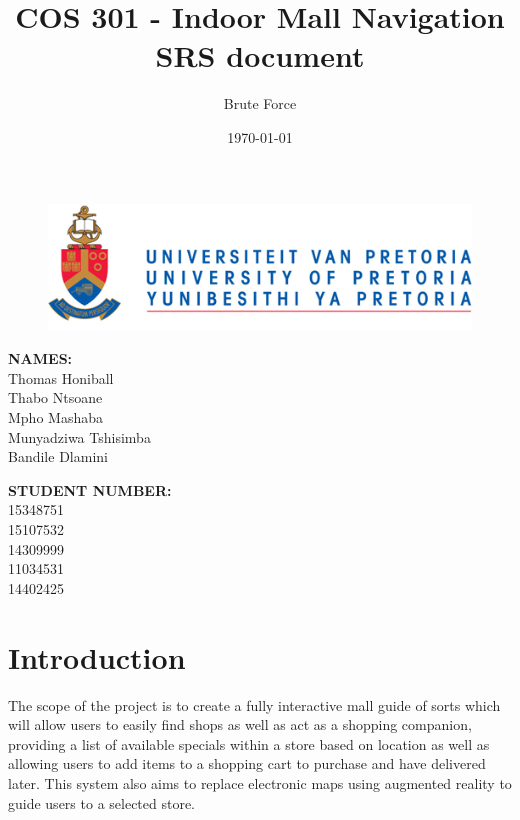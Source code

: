 \documentclass{article}
\title{COS 301 - Indoor Mall Navigation SRS document}
\author{Brute Force}
\date{\today}
\begin{document}
	\maketitle
	
	\begin{figure}[!t]
		\includegraphics{up_logo.png}
	\end{figure}
	\begin{minipage}{0.4\textwidth}
		\begin{flushleft} \large
			\textbf{NAMES:}\\[0.4cm]
			Thomas Honiball\\
			Thabo Ntsoane\\
			Mpho Mashaba\\	
			Munyadziwa Tshisimba\\
			Bandile Dlamini

		\end{flushleft}
	\end{minipage}
	\begin{minipage}{0.4\textwidth}
		\begin{flushright} \large
			\textbf{STUDENT NUMBER:} \\[0.4cm]
		 	15348751\\ 	
		 	15107532\\		
		 	14309999\\		
		 	11034531\\	
		 	14402425
		\end{flushright}
	\end{minipage}

\maketitle

\pagebreak
\tableofcontents
\pagebreak

\section{Introduction}
The scope of the project is to create a fully interactive mall guide of sorts which will allow users to easily find shops as well as act as a shopping companion, providing a list of available specials within a store based on location as well as allowing users to add items to a shopping cart to purchase and have delivered later. This system also aims to replace electronic maps using augmented reality to guide users to a selected store.
\end{document}
